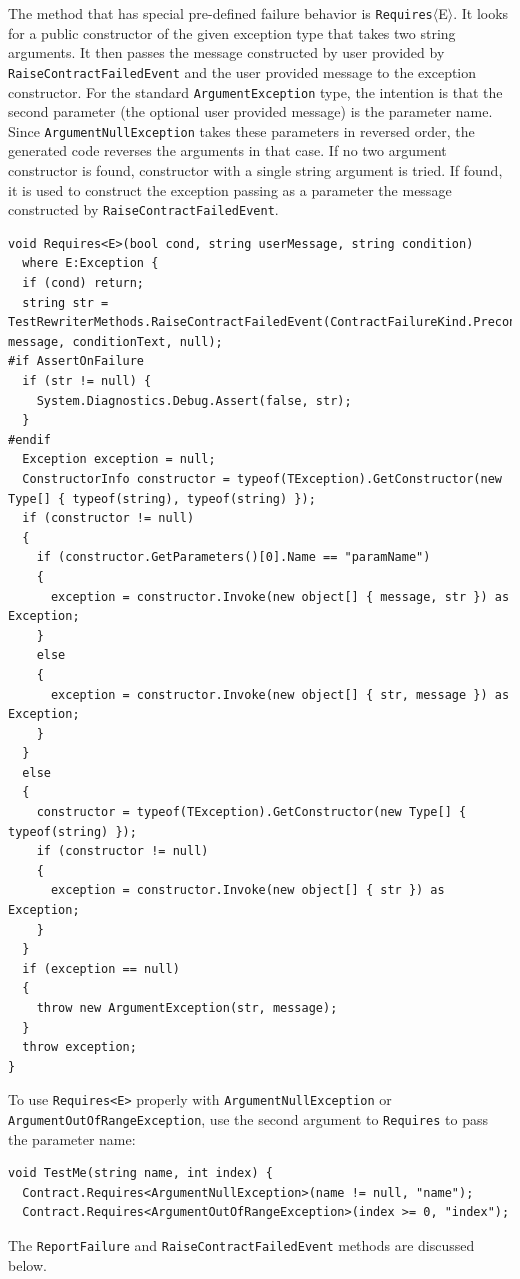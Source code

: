 \documentclass{article}
\newcommand{\code}[1]{\lstinline{#1}}
\newcommand{\requires}[1]{\code{Requires}$\langle$#1$\rangle$}
\begin{document}
The method that has special pre-defined failure behavior is
\requires{E}. It looks for a public constructor of the given exception type
that takes two string arguments. It then passes the message
constructed by user provided by \code{RaiseContractFailedEvent} and
the user provided message to the exception constructor. For the
standard \code{ArgumentException} type, the intention is that the
second parameter (the optional user provided message) is the parameter name.
Since \code{ArgumentNullException} takes these parameters in reversed
order, the generated code reverses the arguments in that case.
If no two argument constructor is found, constructor with a single
string argument is tried. If found, it is used to construct
the exception passing as a parameter the message constructed by
\code{RaiseContractFailedEvent}.
\begin{lstlisting}
void Requires<E>(bool cond, string userMessage, string condition)
  where E:Exception {
  if (cond) return;
  string str = TestRewriterMethods.RaiseContractFailedEvent(ContractFailureKind.Precondition, message, conditionText, null);
#if AssertOnFailure
  if (str != null) {
    System.Diagnostics.Debug.Assert(false, str);
  }
#endif
  Exception exception = null;
  ConstructorInfo constructor = typeof(TException).GetConstructor(new Type[] { typeof(string), typeof(string) });
  if (constructor != null)
  {
    if (constructor.GetParameters()[0].Name == "paramName")
    {
      exception = constructor.Invoke(new object[] { message, str }) as Exception;
    }
    else
    {
      exception = constructor.Invoke(new object[] { str, message }) as Exception;
    }
  }
  else
  {
    constructor = typeof(TException).GetConstructor(new Type[] { typeof(string) });
    if (constructor != null)
    {
      exception = constructor.Invoke(new object[] { str }) as Exception;
    }
  }
  if (exception == null)
  {
    throw new ArgumentException(str, message);
  }
  throw exception;
}
\end{lstlisting}
To use \code{Requires<E>} properly with \code{ArgumentNullException}
or \code{ArgumentOutOfRangeException}, use the second argument to
\code{Requires} to pass the parameter name:
\begin{lstlisting}
void TestMe(string name, int index) {
  Contract.Requires<ArgumentNullException>(name != null, "name");
  Contract.Requires<ArgumentOutOfRangeException>(index >= 0, "index");
\end{lstlisting}

\noindent The \code{ReportFailure} and \code{RaiseContractFailedEvent} methods are discussed
below.
\end{document}
